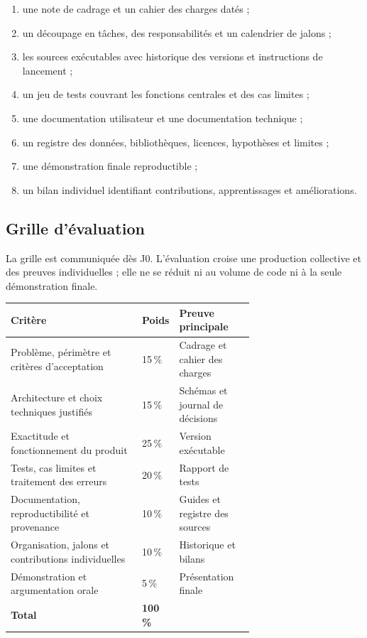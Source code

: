 \begin{enumerate}
  \item une note de cadrage et un cahier des charges datés ;
  \item un découpage en tâches, des responsabilités et un calendrier de jalons ;
  \item les sources exécutables avec historique des versions et instructions de lancement ;
  \item un jeu de tests couvrant les fonctions centrales et des cas limites ;
  \item une documentation utilisateur et une documentation technique ;
  \item un registre des données, bibliothèques, licences, hypothèses et limites ;
  \item une démonstration finale reproductible ;
  \item un bilan individuel identifiant contributions, apprentissages et améliorations.
\end{enumerate}

\subsection*{Grille d'évaluation}

La grille est communiquée dès J0. L'évaluation croise une production collective et des
preuves individuelles ; elle ne se réduit ni au volume de code ni à la seule démonstration
finale.

\begin{center}
\begin{tabular}{|p{0.54\linewidth}|p{0.14\linewidth}|>{\raggedright\arraybackslash}p{\dimexpr\linewidth-6\tabcolsep-4\arrayrulewidth-0.68\linewidth\relax}|}
\hline
\textbf{Critère} & \textbf{Poids} & \textbf{Preuve principale} \\
\hline
Problème, périmètre et critères d'acceptation & 15\,\% & Cadrage et cahier des charges \\
\hline
Architecture et choix techniques justifiés & 15\,\% & Schémas et journal de décisions \\
\hline
Exactitude et fonctionnement du produit & 25\,\% & Version exécutable \\
\hline
Tests, cas limites et traitement des erreurs & 20\,\% & Rapport de tests \\
\hline
Documentation, reproductibilité et provenance & 10\,\% & Guides et registre des sources \\
\hline
Organisation, jalons et contributions individuelles & 10\,\% & Historique et bilans \\
\hline
Démonstration et argumentation orale & 5\,\% & Présentation finale \\
\hline
\textbf{Total} & \textbf{100\,\%} & \\
\hline
\end{tabular}
\end{center}

